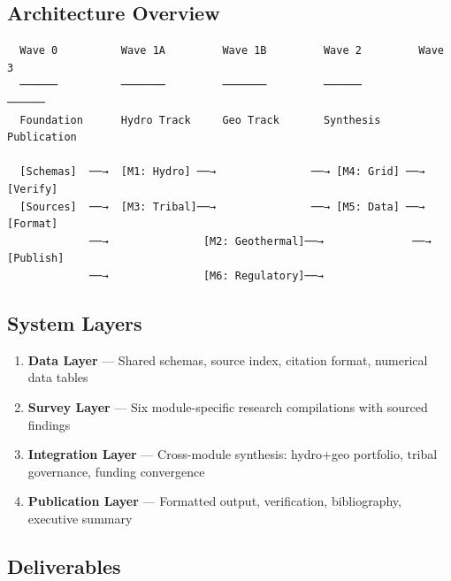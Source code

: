 \documentclass[11pt,letterpaper]{article}
\begin{document}
\subsection{Architecture Overview}

\begin{asciibox}
\begin{verbatim}
  Wave 0          Wave 1A         Wave 1B         Wave 2         Wave 3
  ──────          ───────         ───────         ──────         ──────
  Foundation      Hydro Track     Geo Track       Synthesis      Publication

  [Schemas]  ──→  [M1: Hydro] ──→               ──→ [M4: Grid] ──→ [Verify]
  [Sources]  ──→  [M3: Tribal]──→               ──→ [M5: Data] ──→ [Format]
             ──→               [M2: Geothermal]──→              ──→ [Publish]
             ──→               [M6: Regulatory]──→
\end{verbatim}
\end{asciibox}

\subsection{System Layers}

\begin{enumerate}[leftmargin=2em]
\item \textbf{Data Layer} --- Shared schemas, source index, citation format, numerical data tables
\item \textbf{Survey Layer} --- Six module-specific research compilations with sourced findings
\item \textbf{Integration Layer} --- Cross-module synthesis: hydro+geo portfolio, tribal governance, funding convergence
\item \textbf{Publication Layer} --- Formatted output, verification, bibliography, executive summary
\end{enumerate}

\subsection{Deliverables}
\end{document}
